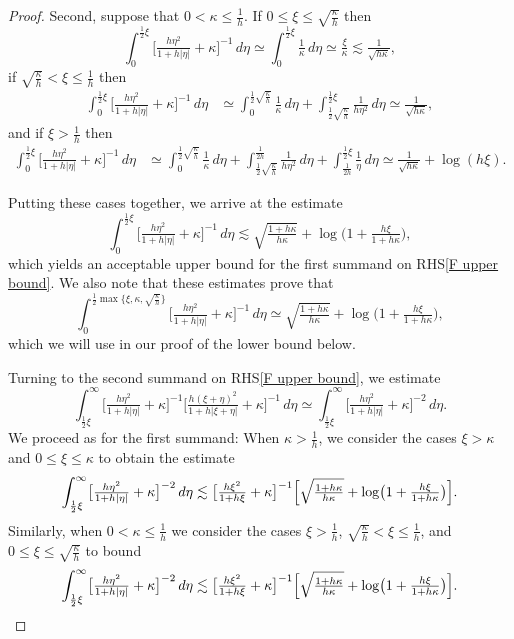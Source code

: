 \documentclass{amsart}
\theoremstyle{definition}
\theoremstyle{remark}
\begin{document}
\begin{proof}
Second, suppose that \(0<\kappa\leq \frac1h\). If \(0\leq\xi\leq \sqrt{\frac\kappa h}\) then
\[
\int_0^{\frac12\xi}\bigl[\tfrac{h\eta^2}{1+h|\eta|} +\kappa\bigr]^{-1}\,d\eta \simeq \int_0^{\frac12\xi}\tfrac1\kappa\,d\eta \simeq \tfrac\xi\kappa\lesssim \tfrac1{\sqrt{h\kappa}},
\]
if \(\sqrt{\frac\kappa h}<\xi\leq\frac1h\) then
\begin{align*}
\int_0^{\frac12\xi}\bigl[\tfrac{h\eta^2}{1+h|\eta|} +\kappa\bigr]^{-1}\,d\eta&\simeq \int_0^{\frac12\sqrt{\frac\kappa h}}\tfrac1\kappa\,d\eta + \int_{\frac12\sqrt{\frac\kappa h}}^{\frac12\xi}\tfrac1{h\eta^2}\,d\eta\simeq \tfrac1{\sqrt{h\kappa}},
\end{align*}
and if \(\xi>\frac1h\) then
\begin{align*}
\int_0^{\frac12\xi}\bigl[\tfrac{h\eta^2}{1+h|\eta|} +\kappa\bigr]^{-1}\,d\eta&\simeq \int_0^{\frac12\sqrt{\frac\kappa h}}\tfrac1\kappa\,d\eta + \int_{\frac12\sqrt{\frac\kappa h}}^{\frac1{2h}}\tfrac1{h\eta^2}\,d\eta + \int_{\frac1{2h}}^{\frac12\xi}\tfrac1\eta\,d\eta\simeq \tfrac1{\sqrt{h\kappa}} + \log(h\xi).
\end{align*}

Putting these cases together, we arrive at the estimate
\[
\int_0^{\frac12\xi} \bigl[\tfrac{h\eta^2}{1+h|\eta|} +\kappa\bigr]^{-1} \,d\eta\lesssim \sqrt{\tfrac{1+h\kappa}{h\kappa}} + \log\bigl(1 + \tfrac{h\xi}{1+h\kappa}\bigr),
\]
which yields an acceptable upper bound for the first summand on RHS\eqref{F upper bound}. We also note that these estimates prove that
\begin{equation}\label{lower bound helper}
\int_0^{\frac12\max\{\xi,\kappa,\sqrt{\frac\kappa h}\}} \bigl[\tfrac{h\eta^2}{1+h|\eta|} +\kappa\bigr]^{-1} \,d\eta\simeq \sqrt{\tfrac{1+h\kappa }{h\kappa}} + \log\bigl(1 + \tfrac{h\xi}{1+h\kappa}\bigr),
\end{equation}
which we will use in our proof of the lower bound below.

Turning to the second summand on RHS\eqref{F upper bound}, we estimate
\[
\int_{\frac12\xi}^\infty \bigl[\tfrac{h\eta^2}{1+h|\eta|} +\kappa\bigr]^{-1}\bigl[\tfrac{h(\xi+\eta)^2}{1+h|\xi+\eta|} + \kappa\bigr]^{-1} \,d\eta\simeq \int_{\frac12\xi}^\infty \bigl[\tfrac{h\eta^2}{1+h|\eta|} +\kappa\bigr]^{-2}\,d\eta.
\]
We proceed as for the first summand: When \(\kappa>\frac1h\), we consider the cases \(\xi>\kappa\) and \(0\leq\xi\leq \kappa\) to obtain the estimate
\[
\int_{\frac12\xi}^\infty \bigl[\tfrac{h\eta^2}{1+h|\eta|} +\kappa\bigr]^{-2}\,d\eta\lesssim \bigl[\tfrac{h\xi^2}{1+h\xi} +\kappa\bigr]^{-1}\Bigl[\sqrt{\tfrac{1+h\kappa}{h\kappa}} + \log\bigl(1 + \tfrac{h\xi}{1+h\kappa}\bigr)\Bigr].
\]
Similarly, when \(0<\kappa\leq \frac1h\) we consider the cases \(\xi>\frac1h\), \(\sqrt{\frac\kappa h}<\xi\leq \frac1h\), and \(0\leq\xi\leq \sqrt{\frac\kappa h}\) to bound
\[
\int_{\frac12\xi}^\infty \bigl[\tfrac{h\eta^2}{1+h|\eta|} +\kappa\bigr]^{-2}\,d\eta\lesssim \bigl[\tfrac{h\xi^2}{1+h\xi} +\kappa\bigr]^{-1}\Bigl[\sqrt{\tfrac{1+h\kappa }{h\kappa}} + \log\bigl(1 + \tfrac{h\xi}{1+h\kappa}\bigr)\Bigr].
\]


\end{proof}
\end{document}
